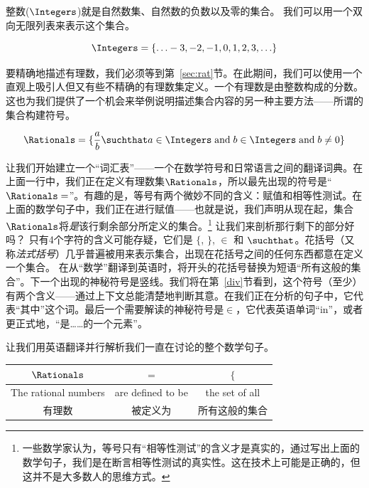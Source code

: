 整数($\Integers$)就是自然数集、自然数的负数以及零的集合。
我们可以用一个双向无限列表来表示这个集合。

\[ \Integers = \{ \ldots -3, -2, -1, 0, 1, 2, 3, \ldots \} \]



要精确地描述有理数，我们必须等到第~\ref{sec:rat}节。在此期间，我们可以使用一个直观上吸引人但又有些不精确的有理数集定义。一个有理数是由整数构成的分数。这也为我们提供了一个机会来举例说明描述集合内容的另一种主要方法——所谓的集合构建符号。

\[ \Rationals = \{ \frac{a}{b} \suchthat a \in \Integers \; \mbox{and} \;
  b \in \Integers \; \mbox{and} \; b \neq 0 \} \]


让我们开始建立一个“词汇表”——一个在数学符号和日常语言之间的翻译词典。在上面一行中，我们正在定义有理数集$\Rationals$，所以最先出现的符号是“$\Rationals =$”。有趣的是，等号有两个微妙不同的含义：赋值和相等性测试。在上面的数学句子中，我们正在进行赋值——也就是说，我们声明从现在起，集合$\Rationals$将{\em 是}该行剩余部分所定义的集合。\footnote{一些数学家认为，等号只有“相等性测试”的含义才是真实的，通过写出上面的数学句子，我们是在断言相等性测试的真实性。这在技术上可能是正确的，但这并不是大多数人的思维方式。} 让我们来剖析那行剩下的部分好吗？
只有4个字符的含义可能存疑，它们是 $\{$, $\}$, $\in$ 和 $\suchthat$。花括号（又称{\em 法式括号}）几乎普遍被用来表示集合，出现在花括号之间的任何东西都意在定义一个集合。
在从“数学”翻译到英语时，将开头的花括号替换为短语“所有这般的集合”。下一个出现的神秘符号是竖线。我们将在第~\ref{div}节看到，这个符号（至少）有两个含义——通过上下文总能清楚地判断其意。在我们正在分析的句子中，它代表“其中”这个词。最后一个需要解读的神秘符号是$\in$，它代表英语单词“in”，或者更正式地，“是……的一个元素”。

让我们用英语翻译并行解析我们一直在讨论的整个数学句子。

\vspace{.2in}

\begin{tabular}{c|c|c}
  \rule[-10pt]{0pt}{22pt} $\Rationals$        & $=$               & $\{$           \\ \hline
  \rule[-6pt]{0pt}{22pt} The rational numbers & are defined to be & the set of all \\
  \rule[-6pt]{0pt}{22pt} 有理数               & 被定义为          & 所有这般的集合 \\
\end{tabular}

\vspace{.2in}

